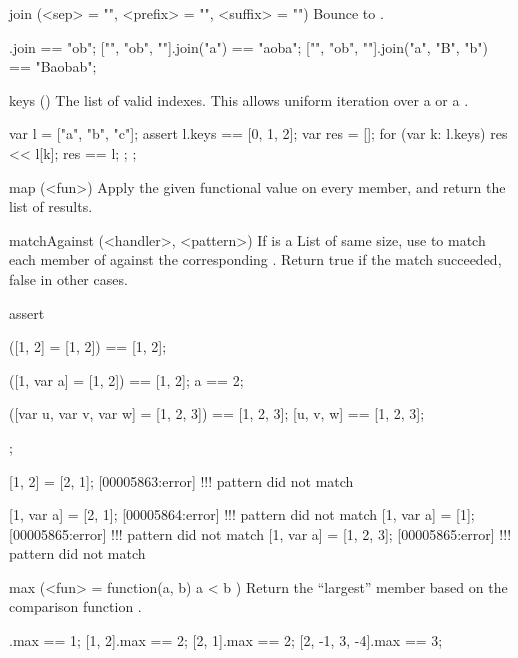 \begin{urbiscriptapi}
\item[join](<sep> = "", <prefix> = "", <suffix> = "")%
  Bounce to .

\begin{urbiassert}
["", "ob", ""].join                == "ob";
["", "ob", ""].join("a")           == "aoba";
["", "ob", ""].join("a", "B", "b") == "Baobab";
\end{urbiassert}

\item[keys]()%
  The list of valid indexes.  This allows uniform iteration over a
   or a .

\begin{urbiscript}
{
  var l = ["a", "b", "c"];
  assert
  {
    l.keys == [0, 1, 2];
    {
      var res = [];
      for (var k: l.keys)
        res << l[k];
      res
    }
    == l;
  };
};
\end{urbiscript}

\item[map](<fun>)%
Apply the given functional value on every member, and return the list
of results.


\item[matchAgainst](<handler>, <pattern>)%
  If  is a List of same size, use  to match each
  member of \this against the corresponding .  Return true if
  the match succeeded, false in other cases.
\begin{urbiscript}
assert
{
  ([1, 2] = [1, 2]) == [1, 2];

  ([1, var a] = [1, 2]) == [1, 2];
  a == 2;

  ([var u, var v, var w] = [1, 2, 3]) == [1, 2, 3];
  [u, v, w] == [1, 2, 3];
};

[1, 2] = [2, 1];
[00005863:error] !!! pattern did not match

[1, var a] = [2, 1];
[00005864:error] !!! pattern did not match
[1, var a] = [1];
[00005865:error] !!! pattern did not match
[1, var a] = [1, 2, 3];
[00005865:error] !!! pattern did not match
\end{urbiscript}

\item[max](<fun> = function(a, b) { a < b })%
  Return the ``largest'' member based on the comparison function .
\begin{urbiassert}
           [1].max == 1;
        [1, 2].max == 2;
        [2, 1].max == 2;
[2, -1, 3, -4].max == 3;


\end{urbiassert}
\end{urbiscriptapi}

